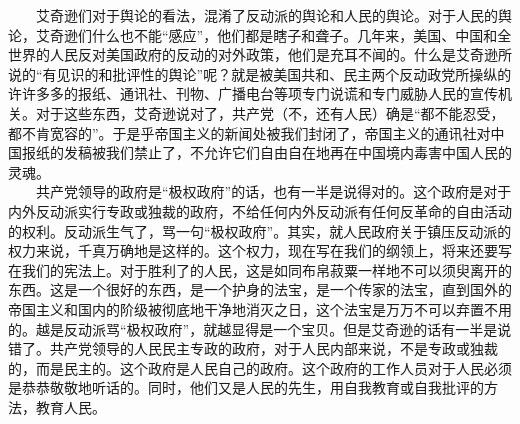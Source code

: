 \documentclass[cn,11pt,chinese]{elegantbook}
\begin{document}
　　艾奇逊们对于舆论的看法，混淆了反动派的舆论和人民的舆论。对于人民的舆论，艾奇逊们什么也不能“感应”，他们都是瞎子和聋子。几年来，美国、中国和全世界的人民反对美国政府的反动的对外政策，他们是充耳不闻的。什么是艾奇逊所说的“有见识的和批评性的舆论”呢？就是被美国共和、民主两个反动政党所操纵的许许多多的报纸、通讯社、刊物、广播电台等项专门说谎和专门威胁人民的宣传机关。对于这些东西，艾奇逊说对了，共产党（不，还有人民）确是“都不能忍受，都不肯宽容的”。于是乎帝国主义的新闻处被我们封闭了，帝国主义的通讯社对中国报纸的发稿被我们禁止了，不允许它们自由自在地再在中国境内毒害中国人民的灵魂。\\
　　共产党领导的政府是“极权政府”的话，也有一半是说得对的。这个政府是对于内外反动派实行专政或独裁的政府，不给任何内外反动派有任何反革命的自由活动的权利。反动派生气了，骂一句“极权政府”。其实，就人民政府关于镇压反动派的权力来说，千真万确地是这样的。这个权力，现在写在我们的纲领上，将来还要写在我们的宪法上。对于胜利了的人民，这是如同布帛菽粟一样地不可以须臾离开的东西。这是一个很好的东西，是一个护身的法宝，是一个传家的法宝，直到国外的帝国主义和国内的阶级被彻底地干净地消灭之日，这个法宝是万万不可以弃置不用的。越是反动派骂“极权政府”，就越显得是一个宝贝。但是艾奇逊的话有一半是说错了。共产党领导的人民民主专政的政府，对于人民内部来说，不是专政或独裁的，而是民主的。这个政府是人民自己的政府。这个政府的工作人员对于人民必须是恭恭敬敬地听话的。同时，他们又是人民的先生，用自我教育或自我批评的方法，教育人民。\\
\end{document}
